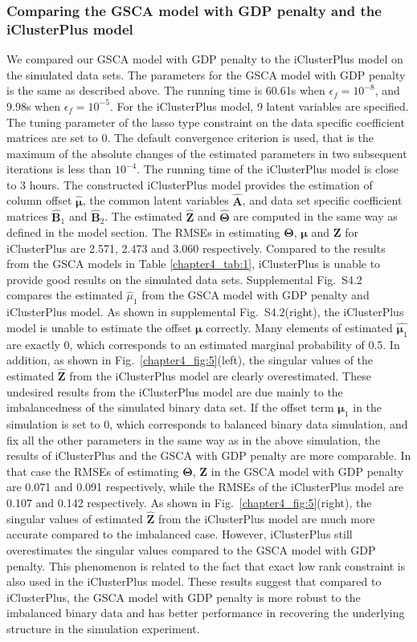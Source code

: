 \subsubsection{Comparing the GSCA model with GDP penalty and the iClusterPlus model}
We compared our GSCA model with GDP penalty to the iClusterPlus model on the simulated data sets. The parameters for the GSCA model with GDP penalty is the same as described above. The running time is 60.61s when $\epsilon_f=10^{-8}$, and 9.98s when $\epsilon_f=10^{-5}$. For the iClusterPlus model, 9 latent variables are specified. The tuning parameter of the lasso type constraint on the data specific coefficient matrices are set to 0. The default convergence criterion is used, that is the maximum of the absolute changes of the estimated parameters in two subsequent iterations is less than $10^{-4}$. The running time of the iClusterPlus model is close to 3 hours. The constructed iClusterPlus model provides the estimation of column offset $\hat{\bm{\mu}}$, the common latent variables $\hat{\mathbf{A}}$, and data set specific coefficient matrices $\hat{\mathbf{B}}_1$ and $\hat{\mathbf{B}}_2$. The estimated $\hat{\mathbf{Z}}$ and $\hat{\mathbf{\Theta}}$ are computed in the same way as defined in the model section. The RMSEs in estimating $\mathbf{\Theta}$, $\bm{\mu}$ and $\mathbf{Z}$ for iClusterPlus are 2.571, 2.473 and 3.060 respectively. Compared to the results from the GSCA models in Table \ref{chapter4_tab:1}, iClusterPlus is unable to provide good results on the simulated data sets. Supplemental Fig.~S4.2 compares the estimated $\hat{\mu}_1$ from the GSCA model with GDP penalty and iClusterPlus model. As shown in supplemental Fig.~S4.2(right), the iClusterPlus model is unable to estimate the offset $\bm{\mu}$ correctly. Many elements of estimated $\hat{\bm{\mu}_1}$ are exactly 0, which corresponds to an estimated marginal probability of 0.5. In addition, as shown in Fig.~\ref{chapter4_fig:5}(left), the singular values of the estimated $\hat{\mathbf{Z}}$ from the iClusterPlus model are clearly overestimated. These undesired results from the iClusterPlus model are due mainly to the imbalancedness of the simulated binary data set. If the offset term $\bm{\mu}_1$ in the simulation is set to 0, which corresponds to balanced binary data simulation, and fix all the other parameters in the same way as in the above simulation, the results of iClusterPlus and the GSCA with GDP penalty are more comparable. In that case the RMSEs of estimating $\mathbf{\Theta}$, $\mathbf{Z}$ in the GSCA model with GDP penalty are 0.071 and 0.091 respectively, while the RMSEs of the iClusterPlus model are 0.107 and 0.142 respectively. As shown in Fig.~\ref{chapter4_fig:5}(right), the singular values of estimated $\hat{\mathbf{Z}}$ from the iClusterPlus model are much more accurate compared to the imbalanced case. However, iClusterPlus still overestimates the singular values compared to the GSCA model with GDP penalty. This phenomenon is related to the fact that exact low rank constraint is also used in the iClusterPlus model. These results suggest that compared to iClusterPlus, the GSCA model with GDP penalty is more robust to the imbalanced binary data and has better performance in recovering the underlying structure in the simulation experiment.


